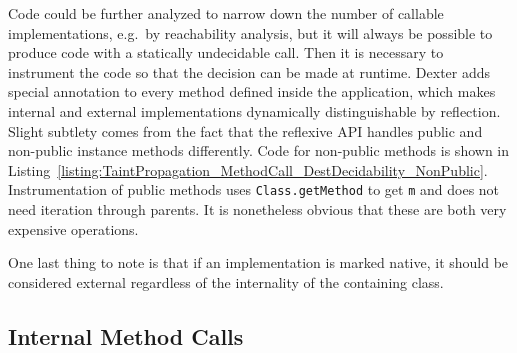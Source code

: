 \documentclass[12pt,twoside,notitlepage]{report}
\begin{document}
Code could be further analyzed to narrow down the number of callable implementations, e.g.\ by reachability analysis, but it will always be possible to produce code with a statically undecidable call. Then it is necessary to instrument the code so that the decision can be made at runtime. Dexter adds special annotation to every method defined inside the application, which makes internal and external implementations dynamically distinguishable by reflection. Slight subtlety comes from the fact that the reflexive API handles public and non-public instance methods differently. Code for non-public methods is shown in Listing~\ref{listing:TaintPropagation_MethodCall_DestDecidability_NonPublic}. Instrumentation of public methods uses \verb$Class.getMethod$ to get \verb$m$ and does not need iteration through parents. It is nonetheless obvious that these are both very expensive operations. 

One last thing to note is that if an implementation is marked native, it should be considered external regardless of the internality of the containing class.

\subsection{Internal Method Calls}
\label{section:TaintPropagation_MethodCalls_Internal}
\end{document}
